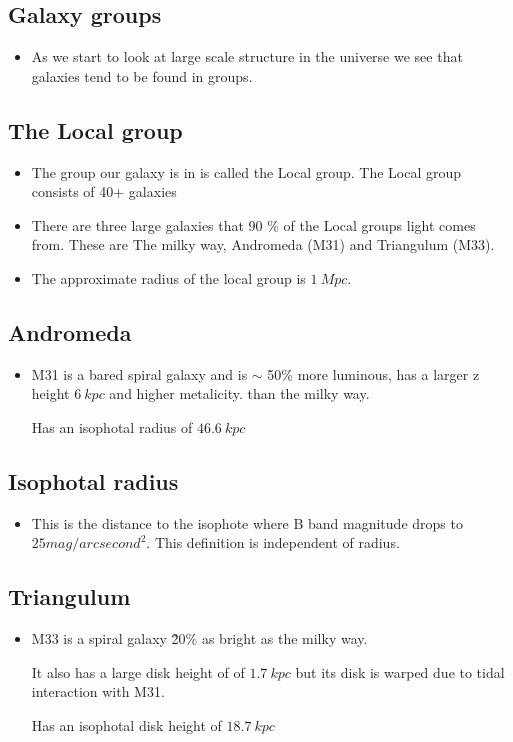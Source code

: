 \documentclass[11pt]{article}
\numberwithin{equation}{section}
\begin{document}
\subsection{Galaxy groups} 
\begin{itemize}
    \item As we start to look at large scale structure in the universe we see that galaxies tend to be found in groups. 



\end{itemize}

\subsection{The Local group}
\begin{itemize}
    \item The group our galaxy is in is called the Local group. The Local group consists of 40+ galaxies 

\item There are three large galaxies that 90 \% of the Local groups light comes from. These are The milky way, Andromeda (M31) and Triangulum (M33). 

\item The approximate radius of the local group is $1 ~Mpc$. 
\end{itemize}

\subsection{Andromeda}
\begin{itemize}
    \item M31 is a bared spiral galaxy and is $\sim$  50\% more luminous, has a larger z height $6~kpc$ and higher metalicity. than the milky way. 

Has an isophotal radius of $46.6 ~kpc$
\end{itemize}

\subsection{Isophotal radius }
\begin{itemize}
    \item This is the distance to the isophote where B band magnitude drops to $25 mag/arcsecond^2$. This definition is independent of radius. 
\end{itemize}

\subsection{Triangulum}
\begin{itemize}
    \item M33 is a spiral galaxy \~ 20\% as bright as the milky way. 

It also has a large disk height of of $1.7 ~kpc$ but its disk is warped due to tidal interaction with M31. 

Has an isophotal disk height of $18.7~kpc$
\end{itemize}
\end{document}
